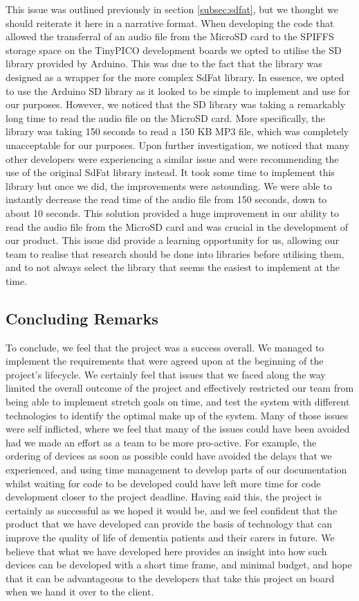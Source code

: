                This issue was outlined previously in section \ref{subsec:sdfat}, but we thought we should reiterate it here in a narrative format. When developing the code that allowed the transferral of an audio file from the MicroSD card to the SPIFFS storage space on the TinyPICO development boards we opted to utilise the SD library provided by Arduino. This was due to the fact that the library was designed as a wrapper for the more complex SdFat library. In essence, we opted to use the Arduino SD library as it looked to be simple to implement and use for our purposes. However, we noticed that the SD library was taking a remarkably long time to read the audio file on the MicroSD card. More specifically, the library was taking 150 seconds to read a 150 KB MP3 file, which was completely unacceptable for our purposes. Upon further investigation, we noticed that many other developers were experiencing a similar issue and were recommending the use of the original SdFat library instead. It took some time to implement this library but once we did, the improvements were astounding. We were able to instantly decrease the read time of the audio file from 150 seconds, down to about 10 seconds. This solution provided a huge improvement in our ability to read the audio file from the MicroSD card and was crucial in the development of our product. This issue did provide a learning opportunity for us, allowing our team to realise that research should be done into libraries before utilising them, and to not always select the library that seems the easiest to implement at the time.

        \subsection{Concluding Remarks}

            To conclude, we feel that the project was a success overall. We managed to implement the requirements that were agreed upon at the beginning of the project's lifecycle. We certainly feel that issues that we faced along the way limited the overall outcome of the project and effectively restricted our team from being able to implement stretch goals on time, and test the system with different technologies to identify the optimal make up of the system. Many of those issues were self inflicted, where we feel that many of the issues could have been avoided had we made an effort as a team to be more pro-active. For example, the ordering of devices as soon as possible could have avoided the delays that we experienced, and using time management to develop parts of our documentation whilst waiting for code to be developed could have left more time for code development closer to the project deadline. Having said this, the project is certainly as successful as we hoped it would be, and we feel confident that the product that we have developed can provide the basis of technology that can improve the quality of life of dementia patients and their carers in future. We believe that what we have developed here provides an insight into how such devices can be developed with a short time frame, and minimal budget, and hope that it can be advantageous to the developers that take this project on board when we hand it over to the client.

